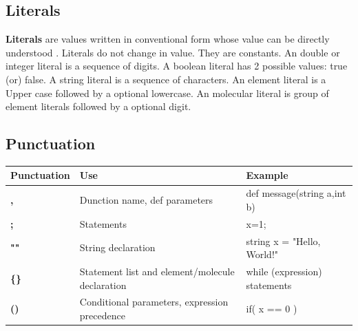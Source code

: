 \documentclass[english,a4paper,12pt]{report}
\begin{document}
\subsection{Literals}
\textbf{Literals} are values written in conventional form whose value can be directly understood . Literals do not change in value. They are constants. An double or integer literal is a sequence of digits. A boolean literal has 2 possible values: true (or) false. A string literal is a sequence of characters. An element literal is a Upper case followed by a optional lowercase. An molecular literal is group of element literals followed by a optional digit. 

\subsection{Punctuation}

\begin{center}
\begin{tabular}{ | m{3cm} | m{7cm}| m{6cm}|} 
\hline
\textbf{Punctuation} & \textbf{Use} & \textbf{Example} \\ 
\hline 
\textbf{,} & Dunction name, def parameters & def message(string a,int b)\\
\hline
\textbf{;} & Statements  & x=1; \\
\hline
\textbf{""} & String declaration & string x = "Hello, World!"\\
\hline
\textbf{\{\}} & Statement list and element/molecule declaration   &  while (expression) { statements } \\
\hline
\textbf{()} & Conditional parameters, expression precedence   &  if( x == 0 ) \\
\hline
\end{tabular}
\end{center}
\end{document}
